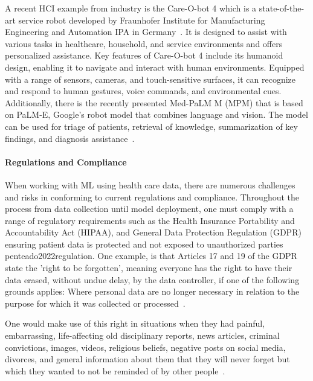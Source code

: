 \documentclass[11pt,runningheads]{article}
\begin{document}
A recent HCI example from industry is the Care-O-bot 4 which is a state-of-the-art service robot developed by Fraunhofer Institute for Manufacturing Engineering and Automation IPA in Germany~\cite{graf2023service}. It is designed to assist with various tasks in healthcare, household, and service environments and offers personalized assistance. Key features of Care-O-bot 4 include its humanoid design, enabling it to navigate and interact with human environments. Equipped with a range of sensors, cameras, and touch-sensitive surfaces, it can recognize and respond to human gestures, voice commands, and environmental cues. Additionally, there is the recently presented Med-PaLM M (MPM) that is based on PaLM-E, Google's robot model that combines language and vision. The model can be used for triage of patients, retrieval of knowledge, summarization of key findings, and diagnosis assistance~\cite{tu2023towards}. 



\paragraph{Regulations and Compliance}
When working with ML using health care data, there are numerous challenges and risks in conforming to current regulations and compliance. Throughout the process from data collection until model deployment, one must comply with a range of regulatory requirements such as the Health Insurance Portability and Accountability Act  (HIPAA), and General Data Protection Regulation (GDPR) ensuring patient data is protected and not exposed to unauthorized parties {penteado2022regulation}. 
One example, is that Articles 17 and 19 of the GDPR state the 'right to be forgotten', meaning everyone has the right to have their data erased, without undue delay, by the data controller, if one of the following grounds applies: Where personal data are no longer necessary in relation to the purpose for which it was collected or processed~\cite{GDPR2016a}.

One would make use of this right in situations when they had painful, embarrassing, life-affecting old disciplinary reports, news articles, criminal convictions, images, videos, religious beliefs, negative posts on social media, divorces, and general information about them that they will never forget but which they wanted to not be reminded of by other people~\cite{eisenhofer2022verifiable}.
\end{document}
